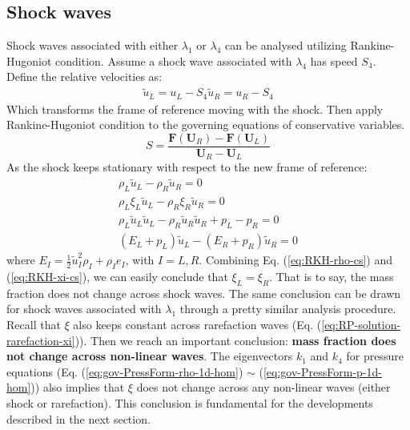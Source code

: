 \subsection{Shock waves}
Shock waves associated with either $\lambda_1$ or $\lambda_4$ can be analysed utilizing Rankine-Hugoniot condition. Assume a shock wave associated with $\lambda_4$ has speed $S_4$. Define the relative velocities as:
\begin{eqnarray}
\tilde{u}_L = u_L - S_4
\tilde{u}_R = u_R - S_4
\end{eqnarray}
Which transforms the frame of reference moving with the shock. Then apply Rankine-Hugoniot condition to the governing equations of conservative variables.
\begin{equation}
S=\frac{\textbf{F}(\textbf{U}_R)-\textbf{F}(\textbf{U}_L)}{\textbf{U}_R - \textbf{U}_L}
\end{equation}
As the shock keeps stationary with respect to the new frame of reference:
\begin{eqnarray}
\rho_L \tilde{u}_L - \rho_R \tilde{u}_R = 0 \label{eq:RKH-rho-cs}\\
\rho_L \xi_L \tilde{u}_L - \rho_R \xi_R \tilde{u}_R = 0 \label{eq:RKH-xi-cs} \\
\rho_L \tilde{u}_L \tilde{u}_L - \rho_R \tilde{u}_R \tilde{u}_R + p_L - p_R = 0 \label{eq:RKH-u-cs} \\
(E_L + p_L) \tilde{u}_L - (E_R + p_R) \tilde{u}_R = 0 \label{eq:RKH-E-cs}
\end{eqnarray}
where $E_I = \frac{1}{2} \tilde{u}^2_I \rho_I + \rho_I e_I$, with $I = L , R$.
Combining Eq. (\ref{eq:RKH-rho-cs}) and (\ref{eq:RKH-xi-cs}), we can easily conclude that $\xi_L = \xi_R$. That is to say, the mass fraction does not change across shock waves. The same conclusion can be drawn for shock waves associated with $\lambda_1$ through a pretty similar analysis procedure. Recall that $\xi$ also keeps constant across rarefaction waves (Eq. (\ref{eq:RP-solution-rarefaction-xi})). Then we reach an important conclusion: \textbf{mass fraction does not change across non-linear waves}. The eigenvectors $k_1$ and $k_4$ for pressure equations (Eq. (\ref{eq:gov-PressForm-rho-1d-hom}) $\sim$ (\ref{eq:gov-PressForm-p-1d-hom})) also implies that $\xi$ does not change across any non-linear waves (either shock or rarefaction). This conclusion is fundamental for the developments described in the next section.

